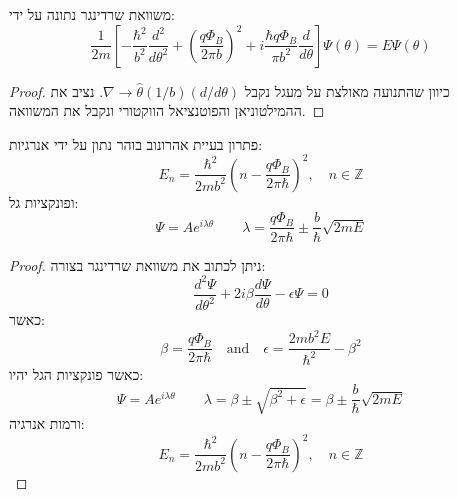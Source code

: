 \documentclass{tstextbook}
\begin{document}
\begin{corollary}
משוואת שרדינגר נתונה על ידי:
$$\frac{1}{2m}\left[-\frac{\hbar^{2}}{b^{2}}\frac{d^{2}}{d\theta^{2}}+\left(\frac{q\Phi_{B}}{2\pi b}\right)^{2}+i\frac{\hbar q\Phi_{B}}{\pi b^{2}}\frac{d}{d\theta}\right]\Psi(\theta)=E\Psi(\theta)$$

\end{corollary}
\begin{proof}
כיוון שהתנועה מאולצת על מעגל נקבל \(\nabla\rightarrow\hat{\theta}(1/b)(d/d\theta)\). נציב את ההמילטוניאן והפוטנציאל הווקטורי ונקבל את המשוואה.

\end{proof}
\begin{proposition}
פתרון בעיית אהרונוב בוהר נתון על ידי אנרגיות:
$$E_{n}=\frac{\hbar^{2}}{2m b^{2}}\left(n-\frac{q\Phi_{B}}{2\pi\hbar}\right)^{2},\quad n\in\mathbb{Z}$$
ופונקציות גל:
$$\Psi=A e^{i\lambda\theta}\qquad \lambda=\frac{q\Phi_{B}}{2\pi\hbar}\pm\frac{b}{\hbar}\sqrt{2m E}$$

\end{proposition}
\begin{proof}
ניתן לכתוב את משוואת שרדינגר בצורה:
$$\frac{d^{2}\Psi}{d\theta^{2}}+2i\beta\frac{d\Psi}{d\theta}-\epsilon\Psi=0$$
כאשר:
$$\beta=\frac{q\Phi_{B}}{2\pi\hbar}\quad\mathrm{and}\quad\epsilon=\frac{2m b^{2}E}{\hbar^{2}}-\beta^{2}$$
כאשר פונקציות הגל יהיו:
$$\Psi=A e^{i\lambda\theta}\qquad \lambda=\beta\pm\sqrt{\beta^{2}+\epsilon}=\beta\pm\frac{b}{\hbar}\sqrt{2m E}$$
ורמות אנרגיה:
$$E_{n}=\frac{\hbar^{2}}{2m b^{2}}\left(n-\frac{q\Phi_{B}}{2\pi\hbar}\right)^{2},\quad n\in\mathbb{Z}$$

\end{proof}
\end{document}
